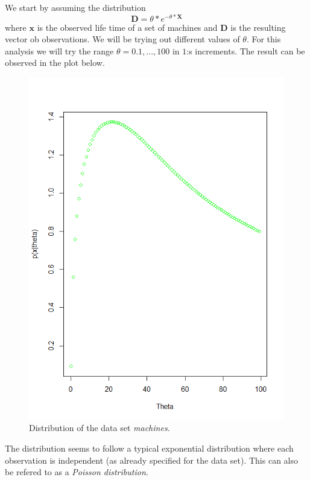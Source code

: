 \documentclass[a4paper,12pt]{article}
\begin{document}
We start by assuming the distribution 
\begin{equation}
  \mathbf{D} = \theta * e^{-\theta * \mathbf{X}}
\end{equation}
where \(\mathbf{x}\) is the observed life time of a set of machines and \( \mathbf{D} \) is the resulting vector ob observations. We will be trying out different values of \(\theta\). For this analysis we will try the range \( \theta = 0.1,...,100\) in  \(1\):s increments. The result can be observed in the plot below.
\begin{figure}[H]
\centering
\begin{minipage}[]{0.5\textwidth}
  \includegraphics[width=\textwidth]{figures/Lab1_A2_data_distribution.png}  
  \caption{Distribution of the data set \textit{machines}.\label{fig:Distribution of the data set machines} }
 \end{minipage}
\end{figure}
The distribution seems to follow a typical exponential distribution where each observation is independent (as already specified for the data set). This can also be refered to as a \textit{Poisson distribution}.
\end{document}
